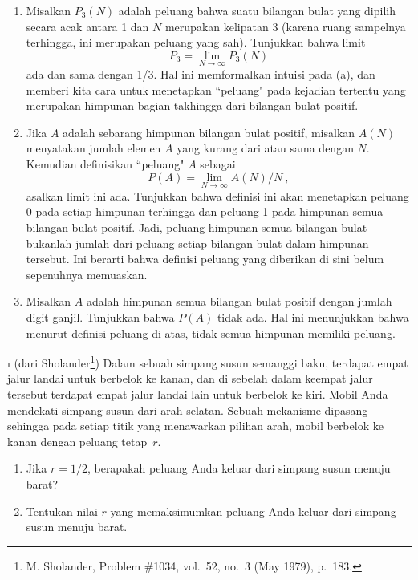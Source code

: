 \begin{LJSItem}
\begin{enumerate}
\item Misalkan $P_3(N)$ adalah peluang bahwa suatu bilangan bulat yang dipilih secara acak
antara 1 dan $N$ merupakan kelipatan 3 (karena ruang sampelnya terhingga, ini
merupakan peluang yang sah).  Tunjukkan bahwa limit
$$
P_3 = \lim_{N \to \infty} P_3(N)
$$
ada dan sama dengan 1/3.  Hal ini memformalkan intuisi pada
(a), dan memberi kita cara untuk menetapkan ``peluang" pada
kejadian tertentu yang merupakan himpunan bagian takhingga dari bilangan bulat positif.

\item Jika $A$ adalah sebarang himpunan bilangan bulat positif, misalkan $A(N)$ menyatakan jumlah
elemen $A$ yang kurang dari atau sama dengan $N$.  Kemudian definisikan
``peluang" $A$ sebagai 
$$
P(A) = \lim_{N \to \infty} A(N)/N\ ,
$$
asalkan limit ini ada.  Tunjukkan bahwa definisi ini akan menetapkan
peluang 0 pada setiap himpunan terhingga dan peluang 1 pada himpunan semua bilangan bulat positif. 
Jadi, peluang himpunan semua bilangan bulat bukanlah jumlah dari
peluang setiap bilangan bulat dalam himpunan tersebut.  Ini berarti bahwa
definisi peluang yang diberikan di sini belum sepenuhnya
memuaskan.

\item Misalkan $A$ adalah himpunan semua bilangan bulat positif dengan jumlah digit ganjil.
Tunjukkan bahwa $P(A)$ tidak ada.  Hal ini menunjukkan bahwa menurut definisi
peluang di atas, tidak semua himpunan memiliki peluang.

\end{enumerate}


\i\label{exer 1.2.28}
(dari Sholander\footnote{M. Sholander, Problem \#1034,  vol.~52,
no.\ 3 (May 1979), p.~183.}) Dalam sebuah
simpang susun semanggi baku, terdapat empat jalur landai untuk berbelok ke kanan, dan di sebelah dalam
keempat jalur tersebut terdapat empat jalur landai lain untuk berbelok ke kiri.  Mobil Anda mendekati
simpang susun dari arah selatan.  Sebuah mekanisme dipasang sehingga pada setiap titik yang
menawarkan pilihan arah, mobil berbelok ke kanan dengan peluang tetap~$r$. 
\begin{enumerate}
\item
Jika $r = 1/2$, berapakah peluang Anda keluar dari simpang susun menuju barat?
\item
Tentukan nilai $r$ yang memaksimumkan peluang Anda keluar dari simpang susun menuju barat.
\end{enumerate}


\end{LJSItem}
